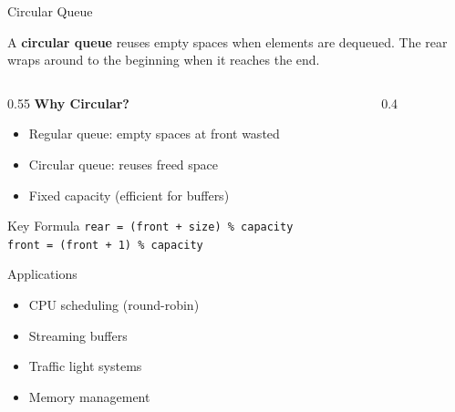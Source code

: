 \documentclass[aspectratio=169,xcolor=dvipsnames]{beamer}
\begin{document}
\begin{frame}{Circular Queue}
  \begin{definition}
    A \textbf{circular queue} reuses empty spaces when elements are dequeued. The rear wraps around to the beginning when it reaches the end.
  \end{definition}

  \vspace{0.3cm}

  \begin{columns}
    \begin{column}{0.55\textwidth}
      \textbf{Why Circular?}
      \begin{itemize}
        \item Regular queue: empty spaces at front wasted
        \item Circular queue: reuses freed space
        \item Fixed capacity (efficient for buffers)
      \end{itemize}

      \vspace{0.3cm}

      \begin{exampleblock}{Key Formula}
        \texttt{rear = (front + size) \% capacity} \\
        \texttt{front = (front + 1) \% capacity}
      \end{exampleblock}

      \vspace{0.3cm}

      \begin{block}{Applications}
        \begin{itemize}
          \item CPU scheduling (round-robin)
          \item Streaming buffers
          \item Traffic light systems
          \item Memory management
        \end{itemize}
      \end{block}
    \end{column}
    \begin{column}{0.4\textwidth}
\end{column}
\end{columns}
\end{frame}
\end{document}
